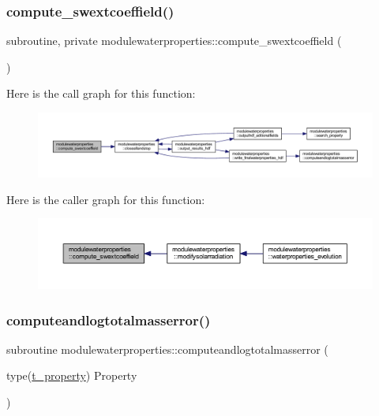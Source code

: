\subsubsection{\texorpdfstring{compute\+\_\+swextcoeffield()}{compute\_swextcoeffield()}}
{\footnotesize\ttfamily subroutine, private modulewaterproperties\+::compute\+\_\+swextcoeffield (\begin{DoxyParamCaption}{ }\end{DoxyParamCaption})\hspace{0.3cm}{\ttfamily [private]}}

Here is the call graph for this function\+:\nopagebreak
\begin{figure}[H]
\begin{center}
\leavevmode
\includegraphics[width=350pt]{namespacemodulewaterproperties_aa1d438c16bd8399614f3b5058f6a58e8_cgraph}
\end{center}
\end{figure}
Here is the caller graph for this function\+:\nopagebreak
\begin{figure}[H]
\begin{center}
\leavevmode
\includegraphics[width=350pt]{namespacemodulewaterproperties_aa1d438c16bd8399614f3b5058f6a58e8_icgraph}
\end{center}
\end{figure}
\mbox{\label{namespacemodulewaterproperties_af1b9165b0e72747e4478868c7e5eff00}} 
\subsubsection{\texorpdfstring{computeandlogtotalmasserror()}{computeandlogtotalmasserror()}}
{\footnotesize\ttfamily subroutine modulewaterproperties\+::computeandlogtotalmasserror (\begin{DoxyParamCaption}\item[{type(\mbox{\hyperlink{structmodulewaterproperties_1_1t__property}{t\+\_\+property}})}]{Property }\end{DoxyParamCaption})\hspace{0.3cm}{\ttfamily [private]}}

